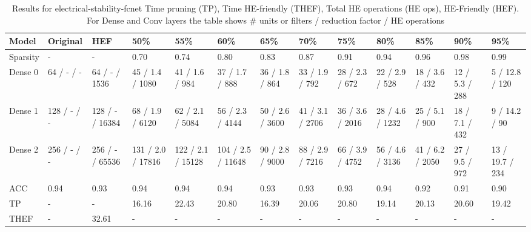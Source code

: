 \begin{table}
\centering
\caption{Results for electrical-stability-fcnet  Time pruning (TP), Time HE-friendly (THEF), Total HE operations (HE ops), HE-Friendly (HEF). For Dense and Conv layers the table shows # units or filters / reduction factor / HE operations}
\label{tab:electrical-stability-fcnet_results}
\begin{tabular}{lllllllllllll}
\toprule
Model &     Original &              HEF &                50\% &                55\% &                60\% &              65\% &              70\% &              75\% &              80\% &              85\% &             90\% &              95\% \\
\midrule
Sparsity  &            - &                - &               0.70 &               0.74 &               0.80 &             0.83 &             0.87 &             0.91 &             0.94 &             0.96 &            0.98 &             0.99 \\
Dense 0   &   64 / - / - &    64 / - / 1536 &    45 / 1.4 / 1080 &     41 / 1.6 / 984 &     37 / 1.7 / 888 &   36 / 1.8 / 864 &   33 / 1.9 / 792 &   28 / 2.3 / 672 &   22 / 2.9 / 528 &   18 / 3.6 / 432 &  12 / 5.3 / 288 &   5 / 12.8 / 120 \\
Dense 1   &  128 / - / - &  128 / - / 16384 &    68 / 1.9 / 6120 &    62 / 2.1 / 5084 &    56 / 2.3 / 4144 &  50 / 2.6 / 3600 &  41 / 3.1 / 2706 &  36 / 3.6 / 2016 &  28 / 4.6 / 1232 &   25 / 5.1 / 900 &  18 / 7.1 / 432 &    9 / 14.2 / 90 \\
Dense 2   &  256 / - / - &  256 / - / 65536 &  131 / 2.0 / 17816 &  122 / 2.1 / 15128 &  104 / 2.5 / 11648 &  90 / 2.8 / 9000 &  88 / 2.9 / 7216 &  66 / 3.9 / 4752 &  56 / 4.6 / 3136 &  41 / 6.2 / 2050 &  27 / 9.5 / 972 &  13 / 19.7 / 234 \\
ACC       &         0.94 &             0.93 &               0.94 &               0.94 &               0.94 &             0.93 &             0.93 &             0.93 &             0.94 &             0.92 &            0.91 &             0.90 \\
TP        &            - &                - &              16.16 &              22.43 &              20.80 &            16.39 &            20.06 &            20.80 &            19.14 &            20.13 &           20.60 &            19.42 \\
THEF      &            - &            32.61 &                  - &                  - &                  - &                - &                - &                - &                - &                - &               - &                - \\

\end{tabular}
\end{table}
